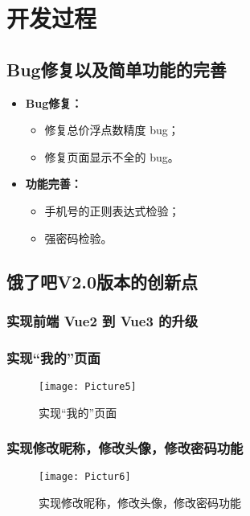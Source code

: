 
\chapter{开发过程}

\section{Bug修复以及简单功能的完善}

\begin{itemize}
  \item \textbf{Bug修复：}
  \begin{itemize}
      \item 修复总价浮点数精度 bug；
      \item 修复页面显示不全的 bug。
  \end{itemize}
  \item \textbf{功能完善：}
  \begin{itemize}
      \item 手机号的正则表达式检验；
      \item 强密码检验。
  \end{itemize}
\end{itemize}


\section{饿了吧V2.0版本的创新点}

\subsection{实现前端 Vue2 到 Vue3 的升级}

\subsection{实现“我的”页面}

\begin{figure}[H]
\centering
\texttt{[image: Picture5]}
\caption{实现“我的”页面}\label{fig:xml}
\end{figure}


\subsection{实现修改昵称，修改头像，修改密码功能}

\begin{figure}[H]
  \centering
  \texttt{[image: Pictur6]}
  \caption{实现修改昵称，修改头像，修改密码功能}\label{fig:xml}
  \end{figure}

